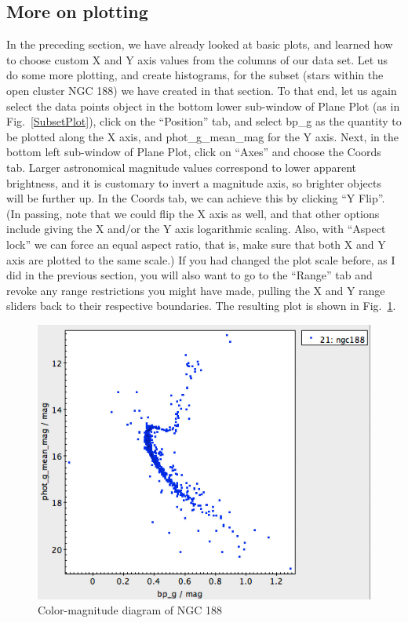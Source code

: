 \documentclass[twocolumn,apj]{openjournal}
\begin{document}
\subsection{More on plotting}

In the preceding section, we have already looked at basic plots, and learned how to choose custom X and Y axis values from the columns of our data set. Let us do some more plotting, and create histograms, for the subset (stars within the open cluster NGC 188) we have created in that section. To that end, let us again select the data points object in the bottom lower sub-window of Plane Plot (as in Fig.~\ref{SubsetPlot}), click on the ``Position'' tab, and select bp\_g as the quantity to be plotted along the X axis, and phot\_g\_mean\_mag for the Y axis. Next, in the bottom left sub-window of  Plane Plot, click on ``Axes'' and choose the Coords tab. Larger astronomical magnitude values correspond to lower apparent brightness, and it is customary to invert a magnitude axis, so brighter objects will be further up. In the Coords tab, we can achieve this by clicking ``Y Flip''. (In passing, note that we could flip the X axis as well, and that other options include giving the X and/or the Y axis logarithmic scaling. Also, with ``Aspect lock'' we can force an equal aspect ratio, that is, make sure that both X and Y axis are plotted to the same scale.) If you had changed the plot scale before, as I did in the previous section, you will also want to go to the ``Range'' tab and revoke any range restrictions you might have made, pulling the X and Y range sliders back to their respective boundaries. The resulting plot is shown in Fig.~\ref{NGC188ColorMag}.
\begin{figure}[htbp]
\begin{center}
\includegraphics[width=\linewidth]{ngc188colormag.jpg}
\caption{Color-magnitude diagram of NGC 188}
\label{NGC188ColorMag}
\end{center}
\end{figure}
\end{document}
